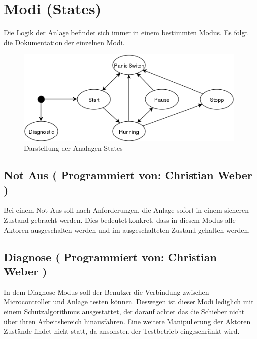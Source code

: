 \documentclass[fontsize=11pt,a4paper,final]{scrartcl}[2003/01/01]
\makeatletter
\def\ScaleIfNeeded{%
	\ifdim\Gin@nat@width>\linewidth
		\linewidth
	\else
		\Gin@nat@width
	\fi
}
\newcommand*{\chris}{%
	Programmiert von: Christian Weber
}
\makeatother
\begin{document}
\section{Modi (States)}
Die Logik der Anlage befindet sich immer in einem bestimmten Modus. Es folgt die Dokumentation der einzelnen Modi.
\begin{figure}[H]
	\centering
	\includegraphics[width=1\ScaleIfNeeded]{Bilder/StateAutomat.png}
	\caption{Darstellung der Analagen States}
	\label{fig:Automat}
\end{figure}

\subsection{Not Aus (\chris)}
Bei einem Not-Aus soll nach Anforderungen, die Anlage sofort in einem sicheren Zustand gebracht werden. Dies bedeutet konkret, dass in diesem Modus alle Aktoren ausgeschalten werden und im ausgeschalteten Zustand gehalten werden.

\subsection{Diagnose (\chris)}
In dem Diagnose Modus soll der Benutzer die Verbindung zwischen Microcontroller und Anlage testen können. Deswegen ist dieser Modi lediglich mit einem Schutzalgorithmus ausgestattet, der darauf achtet das die Schieber nicht über ihren Arbeitsbereich hinausfahren. Eine weitere Manipulierung der Aktoren Zustände findet nicht statt, da ansonsten der Testbetrieb eingeschränkt wird.
\end{document}
